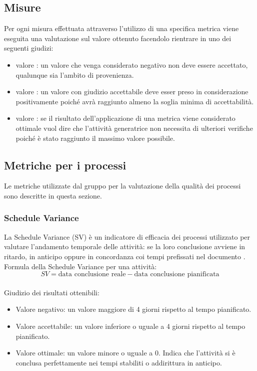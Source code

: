 \documentclass[a4paper, titlepage]{article}
\begin{document}
\subsection{Misure}
Per ogni misura effettuata attraverso l'utilizzo di una specifica metrica viene eseguita una valutazione sul valore ottenuto facendolo rientrare in uno dei seguenti giudizi:
\begin{itemize}
	\item valore : un valore che venga considerato negativo non deve essere accettato, qualunque sia l'ambito di provenienza.
	\item valore : un valore con giudizio accettabile deve esser preso in considerazione positivamente poiché avrà raggiunto almeno la soglia minima di accettabilità.
	\item valore : se il risultato dell'applicazione di una metrica viene considerato ottimale vuol dire che l'attività generatrice non necessita di ulteriori verifiche poiché è stato raggiunto il massimo valore possibile.
\end{itemize} 

\subsection{Metriche per i processi}
Le metriche utilizzate dal gruppo per la valutazione della qualità dei processi sono descritte in questa sezione.

\subsubsection{Schedule Variance}
\label{par:SV}
La Schedule Variance (SV) è un indicatore di efficacia dei processi utilizzato per valutare l'andamento temporale delle attività: se la loro conclusione avviene in ritardo, in anticipo oppure in concordanza coi tempi prefissati nel documento .
\newline Formula della Schedule Variance per una attività:
\begin{displaymath}
SV= \mbox{data conclusione reale} - \mbox{data conclusione pianificata}
\end{displaymath}
\\Giudizio dei risultati ottenibili:
\begin{itemize}
\item Valore negativo: un valore maggiore di 4 giorni rispetto al tempo pianificato.
\item Valore accettabile: un valore inferiore o uguale a 4 giorni rispetto al tempo pianificato.
\item Valore ottimale: un valore minore o uguale a 0. Indica che l'attività si è conclusa perfettamente nei tempi stabiliti o addirittura in anticipo. 
\end{itemize}
\end{document}

